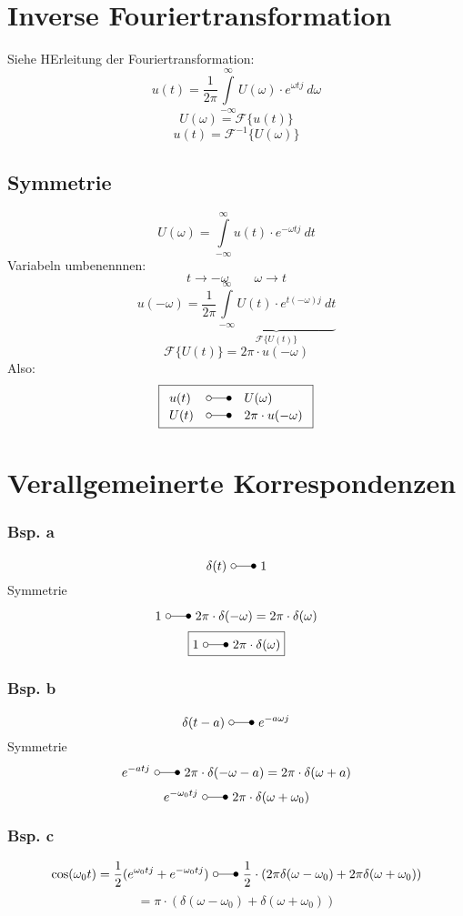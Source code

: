\section{Inverse Fouriertransformation}
Siehe HErleitung der Fouriertransformation: 
\[ u(t) = \frac{1}{2 \pi}  \int\limits_{-\infty}^{\infty} U(\omega) \cdot e^{\omega t j} ~ d\omega \]
\[ U(\omega) = \mathcal{F} \{ u(t) \} \]
\[ u(t) = \mathcal{F}^{-1} \{ U(\omega) \} \]

\subsection{Symmetrie}
\[ U(\omega) = \int\limits_{-\infty}^{\infty} u(t) \cdot e^{-\omega t j} ~ dt \]
Variabeln umbenennnen: 
\[ t \to -\omega \qquad \omega \to t \]
\[ u(-\omega) = \frac{1}{2 \pi} \underbrace{\int\limits_{-\infty}^{\infty} 
U(t) \cdot e^{t (-\omega) j} ~ dt}_{\mathcal{F} \{ U(t) \}} \]
\[ \mathcal{F} \{ U(t) \} = 2 \pi \cdot u(-\omega) \]
Also: 
\[ \boxed{\begin{array}{lll}
u(t) & \laplace & U(\omega)\\
U(t) & \laplace & 2 \pi \cdot u(-\omega)
\end{array}} \]

\section{Verallgemeinerte Korrespondenzen}
\subsubsection{Bsp. a}
\[ \delta(t) ~ \laplace ~ 1 \]
Symmetrie
\[ 1 ~ \laplace ~ 2 \pi \cdot \delta(-\omega) = 2 \pi \cdot \delta(\omega) \]
\[ \boxed{1 ~ \laplace ~ 2 \pi \cdot \delta(\omega)} \]
\subsubsection{Bsp. b}
\[ \delta(t - a) ~ \laplace ~ e^{- a \omega j} \]
Symmetrie
\[ e^{-a t j} ~ \laplace ~ 2 \pi \cdot \delta(-\omega - a) = 2 \pi \cdot \delta(\omega + a) \]
\[ e^{- \omega_0 t j} ~ \laplace ~ 2 \pi \cdot \delta(\omega + \omega_0) \]
\subsubsection{Bsp. c}
\[ \cos(\omega_0 t) = \frac{1}{2} (e^{\omega_0 t j} + e^{-\omega_0 t j}) 
~ \laplace ~ \frac{1}{2} \cdot (2 \pi \delta(\omega - \omega_0) 
+ 2 \pi \delta(\omega + \omega_0)) \]
\[ = \pi \cdot (\delta(\omega - \omega_0) + \delta(\omega + \omega_0)) \]
